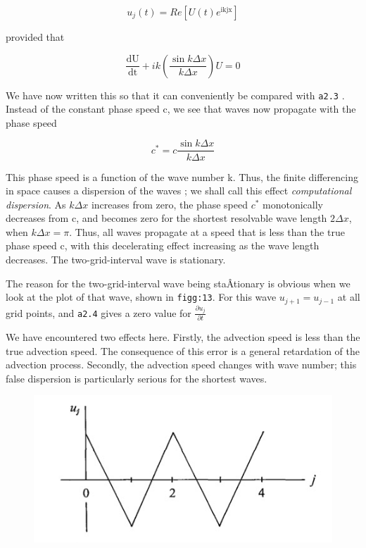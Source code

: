  {\[u_{j}\left( t \right) = Re\left\lbrack U\left( t \right)e^{\text{ikjx}} \right\rbrack\]}

provided that

 {\[\frac{\text{dU}}{\text{dt}} + ik\left( \frac{\sin{k\Delta x}}{k\Delta x} \right)U = 0\]}

We have now written this so that it can conveniently be compared with
\texttt{a2.3} . Instead of the constant phase speed c, we see that waves
now propagate with the phase speed

 {\[c^{*} = c\frac{\sin{k\Delta x}}{k\Delta x}\]}

This phase speed is a function of the wave number k. Thus, the finite
differencing in space causes a dispersion of the waves ; we shall call
this effect \emph{computational dispersion}. As \(k\Delta x\) increases
from zero, the phase speed \(c^{*}\) monotonically decreases from c, and
becomes zero for the shortest resolvable wave length \(2\Delta x\), when
\(k\Delta x = \pi\). Thus, all waves propagate at a speed that is less
than the true phase speed c, with this decelerating effect increasing as
the wave length decreases. The two-grid-interval wave is stationary.

The reason for the two-grid-interval wave being staÂ­tionary is obvious
when we look at the plot of that wave, shown in \texttt{figg:13}. For
this wave \(u_{j + 1} = u_{j - 1}\) at all grid points, and
\texttt{a2.4} gives a zero value for
\(\frac{{\partial u}_{j}}{\partial t}\)

We have encountered two effects here. Firstly, the advection speed is
less than the true advection speed. The consequence of this error is a
general retardation of the advection process. Secondly, the advection
speed changes with wave number; this false dispersion is particularly
serious for the shortest waves.

\begin{figure}
 \centering
 \includegraphics[keepaspectratio]{figs/NM/pic13.jpg}
 \caption{} \label{fig:}
\end{figure}

